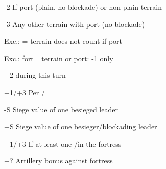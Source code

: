 {{\begin{modlist}
    \item[-2] If port (plain, no blockade) or non-plain terrain
    \item[-3] Any other terrain with port (no blockade)
    \item[Exc.:] \ROTW= terrain does not count if port
    \item[Exc.:] fort= terrain or port: -1 only
    \item[+2]  during this turn
    \item[+1/+3] Per \facemoins/\faceplus
    \item[-S] Siege value of one besieged leader %
    \item[+S] Siege value of one besieger/blockading leader
    \item[+1/+3] If at least one \LD/\ARMY in the fortress
    \item[+?] Artillery bonus against fortress
    \end{modlist}
  }


  \GTdecorate
}

